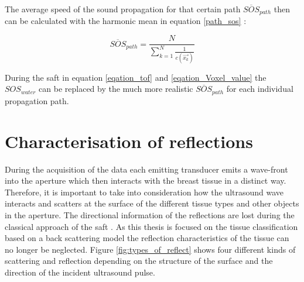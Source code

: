 The average speed of the sound propagation for that certain path $\overline{SOS}_{path}$ then can be calculated with the harmonic mean in equation \ref{path_sos} \cite{Kretzek2014GPUAberration}:

\begin{equation}
 \overline{SOS}_{path} = \frac{N}{\sum_{k=1}^{N}  \frac{1}{c(\overrightarrow {x_k})} } 
\label{path_sos}
\end{equation}

During the \ac{saft} in equation \ref{eqation_tof} and \ref{eqation_Voxel_value} the  $SOS_{water}$ can be replaced by the much more realistic $\overline{SOS}_{path}$ for each individual propagation path.







\section{Characterisation of reflections}
\label{sig:flect_character}

During the acquisition of the data each emitting transducer emits a wave-front into the aperture which then interacts with the breast tissue in a distinct way. Therefore, it is important to take into consideration how the ultrasound wave interacts and scatters at the surface of the different tissue types and other objects in the aperture. The directional information of the reflections are lost during the classical approach of the \ac{saft} \cite{Kretzek2015EvaluationTomography}. As this thesis is focused on the tissue classification based on a back scattering model the reflection characteristics of the tissue can no longer be neglected. Figure \ref{fig:types_of_reflect} shows four different kinds of scattering and reflection depending on the structure of the surface and the direction of the incident ultrasound pulse.

